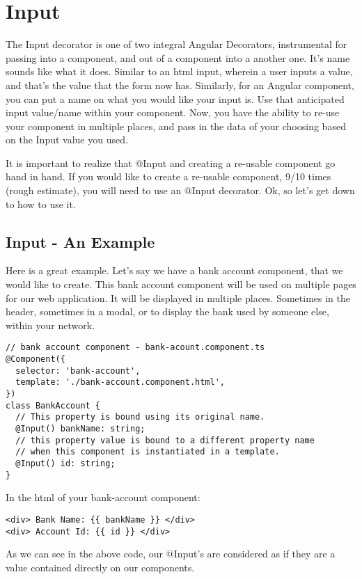 \section{ Input }

The Input decorator is one of two integral Angular Decorators, instrumental
for passing into a component, and out of a component into a another one. It's
name sounds like what it does. Similar to an html input, wherein a user inputs
a value, and that's the value that the form now has. Similarly, for an Angular
component, you can put a name on what you would like your input is. Use that
anticipated input value/name within your component. Now, you have the ability to
re-use your component in multiple places, and pass in the data of your choosing
based on the Input value you used.

It is important to realize that @Input and creating a re-usable component go
hand in hand. If you would like to create a re-usable component, 9/10 times
(rough estimate), you will need to use an @Input decorator. Ok, so let's get
down to how to use it.

\subsection{ Input - An Example }

Here is a great example. Let's say we have a bank account component, that we
would like to create. This bank account component will be used on multiple
pages for our web application. It will be displayed in multiple places.
Sometimes in the header, sometimes in a modal, or to display the bank used by
someone else, within your network.

\begin{lstlisting}
// bank account component - bank-acount.component.ts
@Component({
  selector: 'bank-account',
  template: './bank-account.component.html',
})
class BankAccount {
  // This property is bound using its original name.
  @Input() bankName: string;
  // this property value is bound to a different property name
  // when this component is instantiated in a template.
  @Input() id: string;
}
\end{lstlisting}

In the html of your bank-account component:
\begin{lstlisting}
<div> Bank Name: {{ bankName }} </div>
<div> Account Id: {{ id }} </div>
\end{lstlisting}

As we can see in the above code, our @Input's are considered as if they are
a value contained directly on our components.

